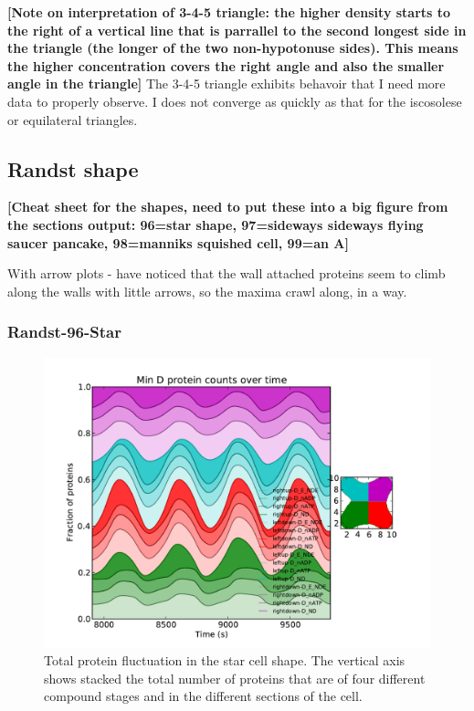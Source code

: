\documentclass[letterpaper,twocolumn,amsmath,amssymb,pre]{revtex4-1}
\newcommand{\red}[1]{{\bf \color{red} #1}}
\newcommand{\fixme}[1]{\red{[#1]}}
\begin{document}
\fixme{Note on interpretation of 3-4-5 triangle: the higher density
  starts to the right of a vertical line that is parrallel to the
  second longest side in the triangle (the longer of the two
  non-hypotonuse sides).  This means the higher concentration covers
  the right angle and also the smaller angle in the triangle} The
3-4-5 triangle exhibits behavoir that I need more data to properly
observe.  I does not converge as quickly as that for the iscosolese or
equilateral triangles.

\subsection{Randst shape}
\fixme{Cheat sheet for the shapes, need to put these into a big figure
  from the sections output: 96=star shape, 97=sideways sideways
  flying saucer pancake, 98=manniks squished cell, 99=an A}

With arrow plots - have noticed that the wall attached proteins seem
to climb along the walls with little arrows, so the maxima crawl
along, in a way.

\begin{figure}

\end{figure}
\subsubsection{Randst-96-Star}
\begin{figure}
  \includegraphics[width=\columnwidth]{../data/shape-randst/plots/box-plot_D--randst-25-600-600-9600-1500}
  \caption{Total protein fluctuation in the star cell shape.  The vertical axis shows stacked the total
    number of proteins that are of four different compound stages and
    in the different sections of the cell.}
  \label{total-oscillation-randst-96-plot}
\end{figure}
\end{document}
